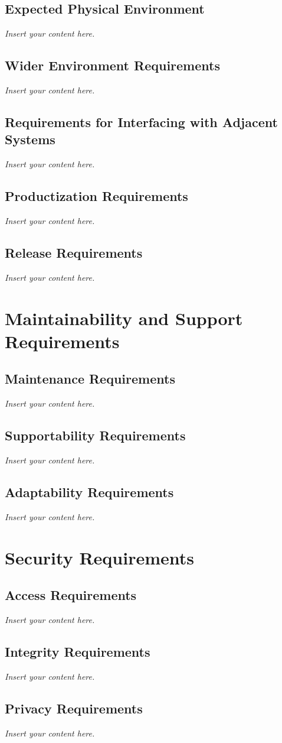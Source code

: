 \documentclass[12pt]{article}
\newcommand{\lips}{\textit{Insert your content here.}}
\begin{document}
\subsection{Expected Physical Environment}
\lips
\subsection{Wider Environment Requirements}
\lips
\subsection{Requirements for Interfacing with Adjacent Systems}
\lips
\subsection{Productization Requirements}
\lips
\subsection{Release Requirements}
\lips

\section{Maintainability and Support Requirements}
\subsection{Maintenance Requirements}
\lips
\subsection{Supportability Requirements}
\lips
\subsection{Adaptability Requirements}
\lips

\section{Security Requirements}
\subsection{Access Requirements}
\lips
\subsection{Integrity Requirements}
\lips
\subsection{Privacy Requirements}
\lips
\end{document}
